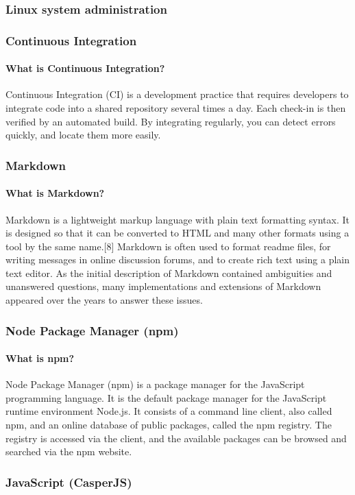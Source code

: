 \documentclass{article}
\begin{document}
\subsubsection{Linux system administration}
\subsubsection{Continuous Integration}
\paragraph{What is Continuous Integration?}
Continuous Integration (CI) is a development practice that requires developers to integrate code into a shared repository several times a day. Each check-in is then verified by an automated build. By integrating regularly, you can detect errors quickly, and locate them more easily.
\subsubsection{Markdown}
\paragraph{What is Markdown?}
Markdown is a lightweight markup language with plain text formatting syntax. It is designed so that it can be converted to HTML and many other formats using a tool by the same name.[8] Markdown is often used to format readme files, for writing messages in online discussion forums, and to create rich text using a plain text editor. As the initial description of Markdown contained ambiguities and unanswered questions, many implementations and extensions of Markdown appeared over the years to answer these issues.
\subsubsection{Node Package Manager (npm)}
\paragraph{What is npm?}
Node Package Manager (npm) is a package manager for the JavaScript programming language. It is the default package manager for the JavaScript runtime environment Node.js. It consists of a command line client, also called npm, and an online database of public packages, called the npm registry. The registry is accessed via the client, and the available packages can be browsed and searched via the npm website.
\subsubsection{JavaScript (CasperJS)}
\end{document}
